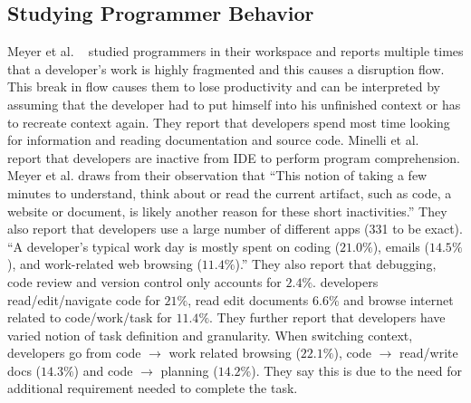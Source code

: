 \subsection{Studying Programmer Behavior}
Meyer et al. ~\cite{Meyer:2017} studied programmers in their workspace and reports multiple times that a developer's work is highly fragmented and this causes a disruption flow. This break in flow causes them to lose productivity and can be interpreted by assuming that the developer had to put himself into his unfinished context or has to recreate context again. They report that developers spend most time looking for information and reading documentation and source code. Minelli et al. ~\cite{Minelli:2015} report that developers are inactive from IDE to perform program comprehension. Meyer et al. draws from their observation that ``This notion of taking a few minutes to understand, think about or read the current artifact, such as code, a website or document, is likely another reason for these short inactivities.'' They also report that developers use a large number of different apps (331 to be exact). 
``A developer's typical work day is mostly spent on coding ($21.0\%$), emails ($14.5\%$), and work-related web browsing ($11.4\%$).''  They also report that debugging, code review and version control only accounts for $2.4\%$. developers read/edit/navigate code for $21\%$, read edit documents $6.6\%$ and browse internet related to code/work/task for $11.4\%$. They further report that developers have varied notion of task definition and granularity. When switching context, developers go from code $\rightarrow$ work related browsing ($22.1\%$), code $\rightarrow$ read/write docs ($14.3\%$) and code $\rightarrow$ planning ($14.2\%$). They say this is due to the need for additional requirement needed to complete the task.

